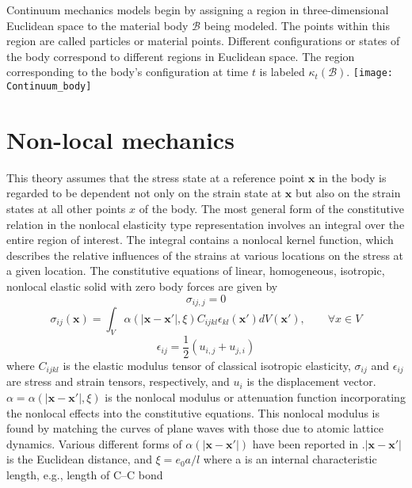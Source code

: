 Continuum mechanics models begin by assigning a region in three-dimensional Euclidean space to the material body $\mathcal{B}$ being modeled. The points within this region are called particles or material points. Different configurations or states of the body correspond to different regions in Euclidean space. The region corresponding to the body's configuration at time $t$ is labeled $\kappa_t(\mathcal{B})$.
\texttt{[image: Continuum\_body]}\\

\section {Non-local mechanics}
This theory assumes that the stress state at a reference point $\mathbf{x}$ in
the body is regarded to be dependent not only on the strain state at
$\mathbf{x}$ but also on the strain states at all other points $x$ of the body. The
most general form of the constitutive relation in the nonlocal
elasticity type representation involves an integral over the entire
region of interest. The integral contains a nonlocal kernel function,
which describes the relative influences of the strains at various
locations on the stress at a given location. The constitutive
equations of linear, homogeneous, isotropic, nonlocal elastic solid
with zero body forces are given by\\
\begin{equation}
\sigma_{ij,j}=0
\end{equation}
\begin{equation}
\sigma_{ij}(\mathbf{x})=\int_V \alpha(|\mathbf{x-x'}|,\xi)C_{ijkl}\epsilon_{kl}(\mathbf{x'})dV(\mathbf{x'}),\qquad \forall x \in V \label{eqNL}
\end{equation}
\begin{equation}
\epsilon_{ij}=\frac{1}{2}(u_{i,j}+u_{j,i})
\end{equation}
where $C_{ijkl}$ is the elastic modulus tensor of classical isotropic
elasticity, $\sigma_{ij}$ and $\epsilon_{ij}$ are stress and strain tensors, respectively,
and $u_i$ is the displacement vector. $\alpha = \alpha(|\mathbf{x-x'}|,\xi)$ is the nonlocal
modulus or attenuation function incorporating the nonlocal effects
into the constitutive equations. This nonlocal modulus is found by
matching the curves of plane waves with those due to atomic lattice
dynamics. Various different forms of $\alpha(|\mathbf{x-x'}|)$ have been reported in \cite{eringen1976nonlocal} .$|\mathbf{x-x'}|$ is the Euclidean distance, and $\xi = e_0 a/l$\cite{peddieson2003application} where a is an internal characteristic length, e.g., length of C–C bond
